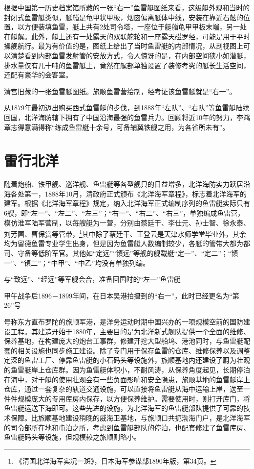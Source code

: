 \documentclass[12pt,UTF8]{ctexbook}
\begin{document}
根据中国第一历史档案馆所藏的一张“右一”鱼雷艇图纸来看，这级艇外观和当时的封闭式鱼雷艇类似，艇艏是龟甲状甲板，烟囱偏离艇体中线，安装在靠近右舷的位置，以方便装填鱼雷，艇上共有2处司令塔，一座位于艇艏龟甲甲板末端，另一处在艇艉。此外，艇上还有一处露天的双联舵轮和一座露天磁罗经，可能是用于平时操舰航行。最为有价值的是，图纸上给出了当时鱼雷艇的内部情况，从剖视图上可以清楚看到内部鱼雷发射管的安放方式，令人惊讶的是，在内部空间狭小如潜艇，排水量仅有几十吨的鱼雷艇上，竟然在艉部单独设置了装修考究的艇长生活空间，还配有豪华的会客室。

清宫旧藏的一张鱼雷艇图纸。旅顺鱼雷营绘制，经考证该鱼雷艇就是“右一”。

从1879年最初迈出购买西式鱼雷艇的步伐，到1888年“左队”、“右队”等鱼雷艇陆续回国，北洋海防辖下拥有了中国沿海最强的鱼雷兵力。回顾将近10年的努力，李鸿章志得意满得称“练成鱼雷艇十余号，可备辅翼铁舰之用，为各省所未有”。

\section{雷行北洋}

随着炮船、铁甲舰、巡洋舰、鱼雷艇等各型舰只的日益增多，北洋海防实力跃居沿海各处第一，1888年10月，清政府正式颁布《北洋海军章程》，标志着北洋海军的建军。根据《北洋海军章程》规定，纳入北洋海军正式编制序列的鱼雷艇实际只有6艘，即“左一”、“左二”、“左三”；“右一”、“右二”、“右三”，单独编成鱼雷营，模仿淮军陆军营制，以每艘艇为一营，分别由蔡廷干、李仕元、孙士智、徐永泰、刘芳圃、曹保赏等管带，\footnote{《清国北洋海军实况一斑》，日本海军参谋部1890年版，第34页。}其中除了蔡廷干、王登云是天津水师学堂毕业外，其余均为留德鱼雷专业学生出身，但是因为鱼雷艇人数编制较少，各艇的管带大都为都司、守备等低阶军官。其他如“定远”“镇远”等舰的舰载艇“定一”、“定二”；“镇一”、“镇二”；“中甲”、“中乙”均没有单独列编。

与“致远”、“经远”等军舰会合，准备回国时的“左一”鱼雷艇

甲午战争后1896－1899年间，在日本吴港拍摄到的“右一”，此时已经更名为“第26”号

号称东方直布罗陀的旅顺军港，是洋务运动时期中国兴办的一项规模空前的国防建设工程。其建造开始于1880年，主要目的是为北洋新式舰队提供一个全面的维修、保养基地，在构建庞大的炮台工事群，修建开挖大型船坞、港池同时，与鱼雷艇配套的相关设施也同步施工建设。除了专门用于保存鱼雷的仓库、维修保养以及调整定深的鱼雷工厂、停靠鱼雷艇的小石码头等设施外，旅顺基地内还建设了蔚为壮观的鱼雷艇岸上仓库群。因为鱼雷艇体积小，不耐风涛，从保养角度起见，长期停泊在海中，对于艇的使用壮观会有一些负面影响和安全隐患，旅顺基地的鱼雷艇岸上仓库，通过一套复杂的轨道交通设施，可以直接将鱼雷艇从海中运输上岸，送至一件件规模庞大的专用库房内保存，以方便保养维护。需要使用时，则打开库门，将鱼雷艇运送下海即可。这些先进的设施，为北洋海军的鱼雷艇部队提供了可靠的技术保障。比旅顺基地建设稍晚的威海卫基地，与旅顺口共扼渤海门户，是北洋海军的司令部所在地和屯泊之所，考虑到鱼雷艇部队的停泊，也配套修建了鱼雷库房、鱼雷艇码头等设施，但规模较之旅顺则略小。
\end{document}
